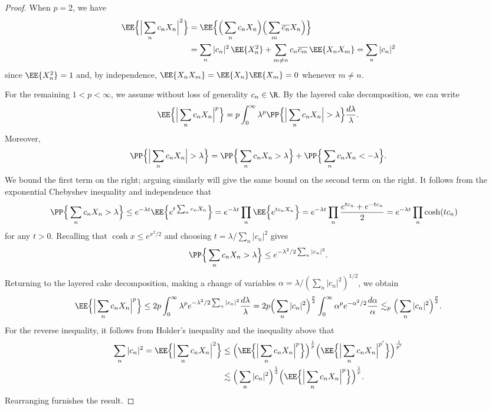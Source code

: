 \documentclass[reqno]{amsart}
\theoremstyle{definition}
\theoremstyle{remark}
\begin{document}
\begin{proof}
	When $p = 2$, we have
		\begin{align*}
			 \EE \Big\{ \Big| \sum_n c_n X_n \Big|^2\Big\}
			 	&= \EE \Big\{ \Big( \sum_n c_n X_n \Big)\Big( \sum_m \overline{c_n} X_n \Big)\Big\} \\
			 	&= \sum_n |c_n|^2 \, \EE \{ X_n^2 \} + \sum_{m \neq n} c_n \overline{c_m} \, \EE\{X_n X_m\} = \sum_n |c_n|^2
		\end{align*}
	since $\EE\{X_n^2\} = 1$ and, by independence, $\EE \{X_n X_m\} = \EE \{X_n\} \EE \{X_m\} = 0$ whenever $m \neq n$. 	
	
	For the remaining $1 < p < \infty$, we assume without loss of generality $c_n \in \R$. By the layered cake decomposition, we can write
		\[ \EE \Big\{ \Big| \sum_n c_n X_n \Big|^p \Big\} = p \int_0^\infty \lambda^p \PP \Big\{ \Big| \sum_n c_n X_n \Big| > \lambda \Big\} \frac{d\lambda}{\lambda}. \]
	Moreover, 
		\[  \PP \Big\{ \Big| \sum_n c_n X_n \Big| > \lambda \Big\} = \PP \Big\{ \sum_n c_n X_n  > \lambda \Big\} + \PP \Big\{  \sum_n c_n X_n < - \lambda \Big\}. \]	
	We bound the first term on the right; arguing similarly will give the same bound on the second term on the right. It follows from the exponential Chebyshev inequality and independence that
		\begin{align*}
			\PP \Big\{ \sum_n c_n X_n  > \lambda \Big\}
				&\leq e^{-\lambda t} \EE \Big\{ e^{t \sum_n c_n X_n} \Big\} = e^{-\lambda t} \prod_n \EE \Big\{ e^{t c_n X_n} \Big\} =e^{-\lambda t} \prod_n \frac{e^{t c_n} + e^{- t c_n}}{2} = e^{-\lambda t} \prod_n \cosh (tc_n)
		\end{align*}	
	for any $t > 0$. Recalling that $\cosh x \leq e^{x^2/2}$	and choosing $t = \lambda /\sum_n |c_n|^2$ gives
		\[ \PP \Big\{ \sum_n c_n X_n  > \lambda \Big\} \leq  e^{-\lambda^2/2\sum_n |c_n|^2} .\]
	Returning to the layered cake decomposition, making a change of variables $\alpha = \lambda /(\sum_n |c_n|^2)^{1/2}$, we obtain
		\[  \EE \Big\{ \Big| \sum_n c_n X_n \Big|^p \Big\} \leq 2p \int_0^\infty \lambda^p e^{-\lambda^2/2 \sum_n |c_n|^2} \frac{d\lambda}{\lambda} = 2p \Big(\sum_n |c_n|^2 \Big)^{\frac{p}{2}} \int_0^\infty \alpha^p e^{-\alpha^2/2} \frac{d\alpha}{\alpha} \lesssim_p \Big(\sum_n |c_n|^2 \Big)^{\frac{p}{2}}. \]	
	For the reverse inequality, it follows from Holder's inequality and the inequality above that
		\begin{align*}
			 \sum_n |c_n|^2 = \EE \Big\{ \Big| \sum_n c_n X_n \Big|^2 \Big\} &\leq \Big( \EE \Big\{ \Big|\sum_n c_n X_n \Big|^p \Big\} \Big)^\frac1p \Big( \EE \Big\{ \Big|\sum_n c_n X_n \Big|^{p'} \Big\} \Big)^\frac{1}{p'} \\
			 & \lesssim \Big(\sum_n |c_n|^2 \Big)^\frac12 \Big( \EE \Big\{ \Big|\sum_n c_n X_n \Big|^p \Big\} \Big)^\frac1p.  
		\end{align*}	 
	Rearranging furnishes the result. 	 
\end{proof}
\end{document}
